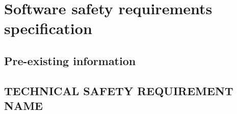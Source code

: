 \section{Software safety requirements specification}
%
%

\subsection{Pre-existing information}
%

\subsection{TECHNICAL SAFETY REQUIREMENT NAME}
%
%
%
